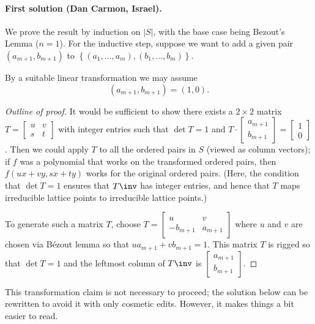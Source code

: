 \documentclass[11pt]{scrartcl}
\begin{document}
\paragraph{First solution (Dan Carmon, Israel).}
We prove the result by induction on $|S|$,
with the base case being Bezout's Lemma ($n=1$).
For the inductive step, suppose we want to add a given pair
$(a_{m+1},b_{m+1})$ to $\left\{ (a_1, \dots, a_m), (b_1, \dots, b_m) \right\}$.
\begin{claim*}
  [Standard]
  By a suitable linear transformation we may assume
  \[ (a_{m+1},b_{m+1}) = (1,0). \]
\end{claim*}
\begin{proof}
  [Outline of proof]
  It would be sufficient to show there exists a $2 \times 2$ matrix
  $T = \left[ \begin{smallmatrix} u & v \\ s & t \end{smallmatrix} \right]$
  with integer entries such that $\det T = 1$ and
  $T \cdot \left[ \begin{smallmatrix} a_{m+1} \\ b_{m+1} \end{smallmatrix} \right]
  = \left[ \begin{smallmatrix} 1 \\ 0 \end{smallmatrix} \right]$.
  Then we could apply $T$ to all the ordered pairs in $S$ (viewed as column vectors);
  if $f$ was a polynomial that works on the transformed ordered pairs,
  then $f(ux+vy, sx+ty)$ works for the original ordered pairs.
  (Here, the condition that $\det T = 1$ ensures that $T\inv$ has integer entries,
  and hence that $T$ maps irreducible lattice points to irreducible lattice points.)

  To generate such a matrix $T$, choose
  $T = \left[ \begin{smallmatrix} u & v  \\ -b_{m+1} & a_{m+1} \end{smallmatrix} \right]$
  where $u$ and $v$ are chosen via B\'{e}zout lemma so that $ua_{m+1} + vb_{m+1} = 1$.
  This matrix $T$ is rigged so that $\det T = 1$ and the leftmost column of $T\inv$ is
  $\left[ \begin{smallmatrix} a_{m+1} \\ b_{m+1} \end{smallmatrix} \right]$.
\end{proof}
\begin{remark*}
  This transformation claim is not necessary to proceed;
  the solution below can be rewritten to avoid it with only cosmetic edits.
  However, it makes things a bit easier to read.
\end{remark*}
\end{document}

